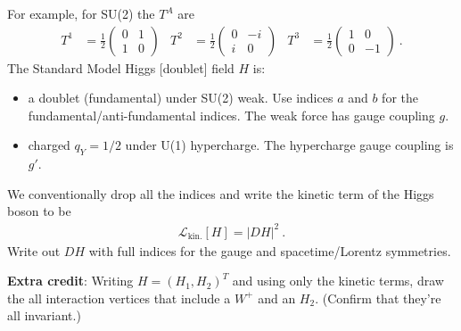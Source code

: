 \documentclass[12pt]{article}
\numberwithin{equation}{section}    %
\begin{document}
For example, for SU(2) the $T^A$ are
\begin{align*}
	T^1 &= \frac 12
	\begin{pmatrix}
		0  & 1\\
		1 & 0
	\end{pmatrix}
	&
	T^2 &= \frac 12
	\begin{pmatrix}
		0  & -i\\
		i & 0
	\end{pmatrix}
	&
	T^3 &= \frac 12
	\begin{pmatrix}
		1  & 0\\
		0 & -1
	\end{pmatrix} \ .
\end{align*}
The Standard Model Higgs [doublet] field $H$ is:
\begin{itemize}
	\item a doublet (fundamental) under SU(2) weak. Use indices $a$ and $b$ for the fundamental/anti-fundamental indices. The weak force has gauge coupling $g$.
	\item charged $q_Y = 1/2$ under U(1) hypercharge. The hypercharge gauge coupling is $g'$.
\end{itemize}
We conventionally drop all the indices and write the kinetic term of the Higgs boson to be
\begin{align*}
	\mathcal L_\text{kin.}[H] = |DH|^2 \ .
\end{align*}
Write out $DH$ with full indices for the gauge and spacetime/Lorentz symmetries. 


\textbf{Extra credit}: Writing $H=(H_1, H_2)^T$ and using only the kinetic terms, draw the all interaction vertices that include a $W^+$ and an $H_2$. (Confirm that they're all invariant.)
\end{document}
